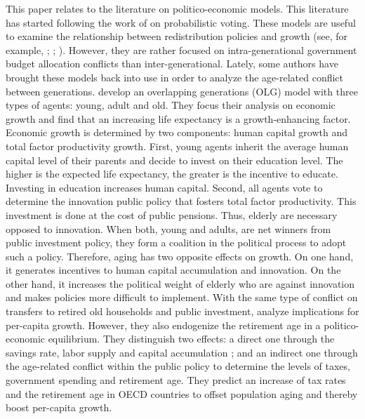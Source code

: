 This paper relates to the literature on politico-economic models. This literature has started following the work of \cite{Lindbeck1987} on probabilistic voting. These models are useful to examine the relationship between redistribution policies and growth (see, for example, \citealt{Alesina1994}; \citealt{Persson1994}; \citealt{Krusell1997}). However, they are rather focused on intra-generational government budget allocation conflicts than inter-generational. Lately, some authors have brought these models back into use in order to analyze the age-related conflict between generations.
\cite{Lancia2012} develop an overlapping generations (OLG) model with three types of agents: young, adult and old. They focus their analysis on economic growth and find that an increasing life expectancy is a growth-enhancing factor. Economic growth is determined by two components: human capital growth and total factor productivity growth. First, young agents inherit the average human capital level of their parents and decide to invest on their education level. The higher is the expected life expectancy, the greater is the incentive to educate. Investing in education increases human capital. Second, all agents vote to determine the innovation public policy that fosters total factor productivity. This investment is done at the cost of public pensions. Thus, elderly are necessary opposed to innovation. When both, young and adults, are net winners from public investment policy, they form a coalition in the political process to adopt such a policy. Therefore, aging has two opposite effects on growth. On one hand, it generates incentives to human capital accumulation and innovation. On the other hand, it increases the political weight of elderly who are against innovation and makes policies more difficult to implement.
With the same type of conflict on transfers to retired old households and public investment, \cite{Gonzalez-Eiras2012} analyze implications for per-capita growth. However, they also endogenize the retirement age in a politico-economic equilibrium. They distinguish two effects: a direct one through the savings rate, labor supply and capital accumulation ; and an indirect one through the age-related conflict within the public policy to determine the levels of taxes, government spending and retirement age. They predict an increase of tax rates and the retirement age in OECD countries to offset population aging and thereby boost per-capita growth.

